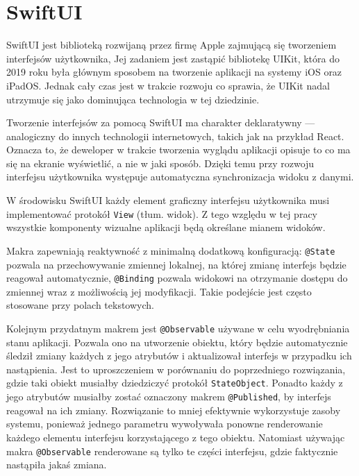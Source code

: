 \documentclass[final,a4paper,openany,12pt]{mwbk}
\begin{document}
\section{SwiftUI}

SwiftUI \cite{swiftui_xcode} jest biblioteką rozwijaną przez firmę Apple zajmującą się tworzeniem interfejsów użytkownika, Jej zadaniem jest zastąpić bibliotekę UIKit, która do 2019 roku była głównym sposobem na tworzenie aplikacji na systemy iOS oraz iPadOS. Jednak cały czas jest w trakcie rozwoju co sprawia, że UIKit nadal utrzymuje się jako dominująca technologia w tej dziedzinie. 

Tworzenie interfejsów za pomocą SwiftUI \cite{apple_swiftui} ma charakter deklaratywny --- analogiczny do innych technologii internetowych, takich jak na przykład React. Oznacza to, że deweloper w trakcie tworzenia wyglądu aplikacji opisuje to co ma się na ekranie wyświetlić, a nie w jaki sposób. Dzięki temu przy rozwoju interfejsu użytkownika występuje automatyczna synchronizacja widoku z danymi. 

W środowisku SwiftUI każdy element graficzny interfejsu użytkownika musi implementować protokół \texttt{View} (tłum. widok). Z tego względu w tej pracy wszystkie komponenty wizualne aplikacji będą określane mianem widoków.

Makra zapewniają reaktywność z minimalną dodatkową konfiguracją: \texttt{@State} pozwala na przechowywanie zmiennej lokalnej, na której zmianę interfejs będzie reagował automatycznie, \texttt{@Binding} pozwala widokowi na otrzymanie dostępu do zmiennej wraz z możliwością jej modyfikacji. Takie podejście jest często stosowane przy polach tekstowych. 

Kolejnym przydatnym makrem jest \texttt{@Observable} używane w celu wyodrębniania stanu aplikacji. Pozwala ono na utworzenie obiektu, który będzie automatycznie śledził zmiany każdych z jego atrybutów i aktualizował interfejs w przypadku ich nastąpienia. Jest to uproszczeniem w porównaniu do poprzedniego rozwiązania, gdzie taki obiekt musiałby dziedziczyć protokół \texttt{StateObject}. Ponadto każdy z jego atrybutów musiałby zostać oznaczony makrem \texttt{@Published}, by interfejs reagował na ich zmiany. Rozwiązanie to mniej efektywnie wykorzystuje zasoby systemu, ponieważ jednego parametru wywoływała ponowne renderowanie każdego elementu interfejsu korzystającego z tego obiektu. Natomiast używając makra \texttt{@Observable} renderowane są tylko te części interfejsu, gdzie faktycznie nastąpiła jakaś zmiana.
\end{document}
